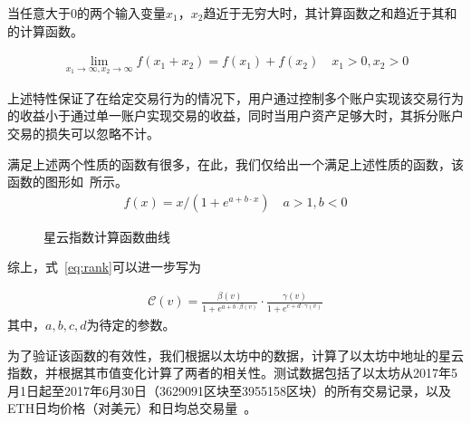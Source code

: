 \begin{property}
\label{prop:two}
当任意大于$0$的两个输入变量$x_1$，$x_2$趋近于无穷大时，其计算函数之和趋近于其和的计算函数。
\end{property}

\begin{align}
\lim\limits_{x_1 \to \infty, x_2\to \infty} f(x_1+x_2) = f(x_1) + f(x_2)\quad x_1>0, x_2>0
\end{align}

\noindent 上述特性保证了在给定交易行为的情况下，用户通过控制多个账户实现该交易行为的收益小于通过单一账户实现交易的收益，同时当用户资产足够大时，其拆分账户交易的损失可以忽略不计。

\noindent 满足上述两个性质的函数有很多，在此，我们仅给出一个满足上述性质的函数，该函数的图形如~所示。
\begin{align}
f(x) = x/(1 + e^{a + b\cdot x}) \quad a>1,b<0
\end{align}

\begin{figure}
\centering
{}
\caption{星云指数计算函数曲线 \label{fig-nr}}
\end{figure}


\vspace{2em}
综上，式~\ref{eq:rank}可以进一步写为

\begin{align}
\label{eq:rank-param}
\mathcal{C}(v) =  \frac{\beta(v)}{1+e^{a + b \cdot \beta(v)}} \cdot \frac{\gamma(v)}{1+e^{c + d \cdot \gamma(v)}}
\end{align}
\noindent 其中，$a, b, c, d$为待定的参数。

为了验证该函数的有效性，我们根据以太坊中的数据，计算了以太坊中地址的星云指数，并根据其市值变化计算了两者的相关性。测试数据包括了以太坊从2017年5月1日起至2017年6月30日（3629091区块至3955158区块）的所有交易记录，以及ETH日均价格（对美元）和日均总交易量~\cite{coinmarketcap}。


